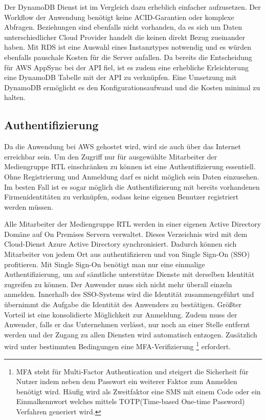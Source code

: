 {Der DynamoDB Dienst ist im Vergleich dazu erheblich einfacher aufzusetzen.
Der Workflow der Anwendung benötigt keine ACID-Garantien oder komplexe Abfragen. Beziehungen sind ebenfalls nicht vorhanden, da es sich um Daten unterschiedlicher
Cloud Provider handelt die keinen direkt Bezug zueinander haben.
Mit RDS ist eine Auswahl eines Instanztypes notwendig und es würden ebenfalls pauschale Kosten für die Server anfallen.
Da bereits die Entscheidung für AWS AppSync bei der API fiel, ist es zudem eine erhebliche Erleichterung eine DynamoDB Tabelle mit der API zu verknüpfen.
Eine Umsetzung mit DynamoDB ermöglicht es den Konfigurationsaufwand und die Kosten minimal zu halten.


\subsection{Authentifizierung}
\label{Authentifizierung}
Da die Anwendung bei AWS gehostet wird, wird sie auch über das Internet erreichbar sein.
Um den Zugriff nur für ausgewählte Mitarbeiter der Mediengruppe RTL einschränken zu können ist eine Authentifizierung essentiell.
Ohne Registrierung und Anmeldung darf es nicht möglich sein Daten einzusehen.
Im besten Fall ist es sogar möglich die Authentifizierung mit bereits vorhandenen Firmenidentitäten zu verknüpfen, sodass keine eigenen
Benutzer registriert werden müssen.

Alle Mitarbeiter der Mediengruppe RTL werden in einer eigenen Active Directory Domäne auf On Premises Servern verwaltet.
Dieses Verzeichnis wird mit dem Cloud-Dienst Azure Active Directory synchronisiert.
Dadurch können sich Mitarbeiter von jedem Ort aus authentifizieren und von Single Sign-On (SSO) profitieren.
Mit Single Sign-On benötigt man nur eine einmalige Authentifizierung, um auf sämtliche unterstütze Dienste mit derselben Identität zugreifen zu können.
Der Anwender muss sich nicht mehr überall einzeln anmelden.
Innerhalb des SSO-Systems wird die Identität zusammengeführt und übernimmt die Aufgabe die Identität des Anwenders zu bestätigen.
Größter Vorteil ist eine konsolidierte Möglichkeit zur Anmeldung. Zudem muss der Anwender, falls er das Unternehmen verlässt, nur noch an einer Stelle entfernt werden und der Zugang zu allen Diensten wird automatisch entzogen.
Zusätzlich wird unter bestimmten Bedingungen eine MFA-Verifizierung \footnote{MFA steht für Multi-Factor Authentication und steigert die Sicherheit für Nutzer indem neben dem Passwort
ein weiterer Faktor zum Anmelden benötigt wird. Häufig wird als Zweitfaktor eine SMS mit einem Code oder
ein Einmalkennwort welches mittels TOTP(Time-based One-time Password) Verfahren generiert wird. } erfordert.

}
